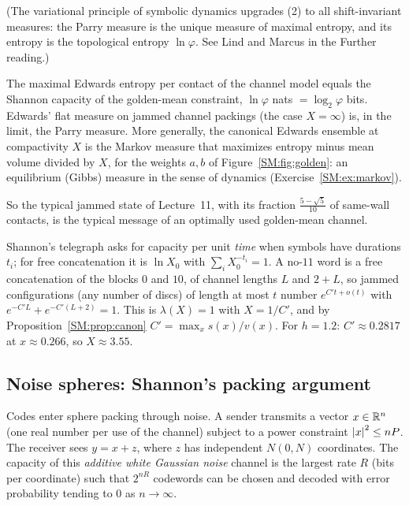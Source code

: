 (The variational principle of symbolic dynamics upgrades (2) to all shift-invariant measures: the Parry
measure is the unique measure of maximal entropy, and its entropy is the topological entropy
$\ln\varphi$. See Lind and Marcus in the Further reading.)

\begin{corollary}\label{SM:cor:capacity}
The maximal Edwards entropy per contact of the channel model equals the Shannon capacity of the
golden-mean constraint, $\ln\varphi$ nats $=\log_2\varphi$ bits. Edwards' flat measure on jammed
channel packings (the case $X=\infty$) is, in the limit, the Parry measure. More generally, the
canonical Edwards ensemble at compactivity $X$ is the Markov measure that maximizes entropy minus mean volume divided by $X$, for the weights $a,b$ of
Figure~\ref{SM:fig:golden}: an equilibrium (Gibbs) measure in the sense of dynamics (Exercise~\ref{SM:ex:markov}).
\end{corollary}

So the typical jammed state of Lecture~11, with its fraction $\frac{5-\sqrt5}{10}$ of same-wall contacts, is
the typical message of an optimally used golden-mean channel.

\begin{remark}
Shannon's telegraph asks for capacity per unit \emph{time} when symbols have durations $t_i$; for free
concatenation it is $\ln X_0$ with $\sum_iX_0^{-t_i}=1$. A no-$11$ word is a free concatenation of the blocks
$0$ and $10$, of channel lengths $L$ and $2+L$, so jammed configurations (any number of discs) of length
at most $t$ number $e^{C't+o(t)}$ with $e^{-C'L}+e^{-C'(L+2)}=1$. This is $\lambda(X)=1$ with $X=1/C'$, and by
Proposition~\ref{SM:prop:canon} $C'=\max_xs(x)/v(x)$. For $h=1.2$: $C'\approx0.2817$ at $x\approx0.266$, so
$X\approx3.55$.
\end{remark}

\subsection{Noise spheres: Shannon's packing argument}

Codes enter sphere packing through noise. A sender transmits a vector $x\in\mathbb{R}^n$ (one real number per
use of the channel) subject to a power constraint $\left\lvert x \right\rvert^2\le nP$. The receiver sees $y=x+z$, where $z$ has
independent $N(0,N)$ coordinates. The capacity of this \emph{additive white Gaussian noise} channel is
the largest rate $R$ (bits per coordinate) such that $2^{nR}$ codewords can be chosen and decoded with
error probability tending to $0$ as $n\to\infty$.


